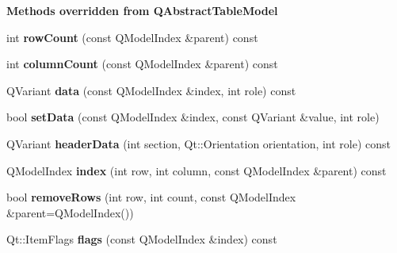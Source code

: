 \begin{Indent}\textbf{ Methods overridden from Q\+Abstract\+Table\+Model}\par
\begin{DoxyCompactItemize}
\item 
\mbox{\label{class_address_table_model_ad8c8ff8503ba79d891c792dc7fc9d951}} 
int {\bfseries row\+Count} (const Q\+Model\+Index \&parent) const
\item 
\mbox{\label{class_address_table_model_a1cd0fc2848f0251a7100440e10d084e2}} 
int {\bfseries column\+Count} (const Q\+Model\+Index \&parent) const
\item 
\mbox{\label{class_address_table_model_a79b07007c147962c0119310ebd4931c1}} 
Q\+Variant {\bfseries data} (const Q\+Model\+Index \&index, int role) const
\item 
\mbox{\label{class_address_table_model_a5c6bd467fd1fc499d126fe2b7380ce5c}} 
bool {\bfseries set\+Data} (const Q\+Model\+Index \&index, const Q\+Variant \&value, int role)
\item 
\mbox{\label{class_address_table_model_a30e1816a06ef83a2bb6eb495e5ae70ce}} 
Q\+Variant {\bfseries header\+Data} (int section, Qt\+::\+Orientation orientation, int role) const
\item 
\mbox{\label{class_address_table_model_a74e9123471948255f87271c823c82854}} 
Q\+Model\+Index {\bfseries index} (int row, int column, const Q\+Model\+Index \&parent) const
\item 
\mbox{\label{class_address_table_model_a682e6e3374d65543e49769906c8916e5}} 
bool {\bfseries remove\+Rows} (int row, int count, const Q\+Model\+Index \&parent=Q\+Model\+Index())
\item 
\mbox{\label{class_address_table_model_a5b5e72b36671632ac72921071b3ec8c3}} 
Qt\+::\+Item\+Flags {\bfseries flags} (const Q\+Model\+Index \&index) const
\end{DoxyCompactItemize}
\end{Indent}
